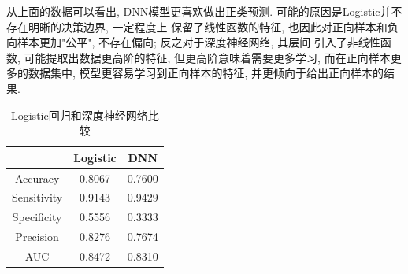 从上面的数据可以看出, DNN模型更喜欢做出正类预测. 可能的原因是Logistic并不存在明晰的决策边界, 一定程度上
保留了线性函数的特征, 也因此对正向样本和负向样本更加"公平", 不存在偏向; 反之对于深度神经网络, 其层间
引入了非线性函数, 可能提取出数据更高阶的特征, 但更高阶意味着需要更多学习, 而在正向样本更多的数据集中, 
模型更容易学习到正向样本的特征, 并更倾向于给出正向样本的结果.

\begin{table}
    \centering
    \begin{tabular}{c|cc}
        & Logistic & DNN \\\hline
        Accuracy & 0.8067 & 0.7600 \\
        Sensitivity & 0.9143 & 0.9429 \\
        Specificity & 0.5556 & 0.3333 \\
        Precision & 0.8276 & 0.7674 \\
        AUC & 0.8472 & 0.8310
    \end{tabular}
    \caption{Logistic回归和深度神经网络比较}\label{tbl:log-dnn}
\end{table}
